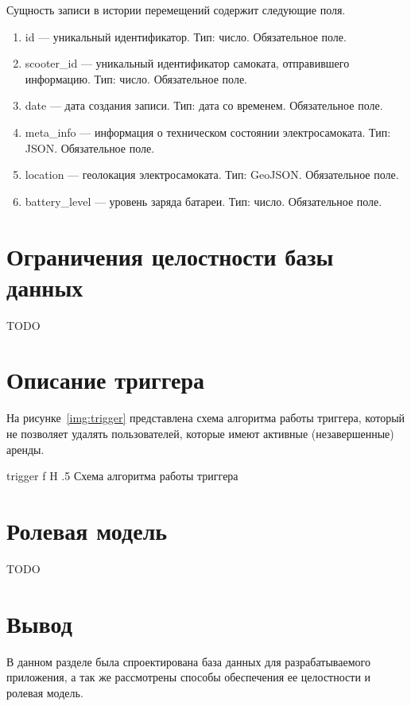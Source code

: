 Сущность записи в истории перемещений содержит следующие поля.

\begin{enumerate}
    \item id --- уникальный идентификатор. Тип: число. Обязательное поле.
    \item scooter\_id --- уникальный идентификатор самоката, отправившего информацию. Тип: число. Обязательное поле.
    \item date --- дата создания записи. Тип: дата со временем. Обязательное поле.
    \item meta\_info --- информация о техническом состоянии электросамоката. Тип: JSON. Обязательное поле.
    \item location --- геолокация электросамоката. Тип: GeoJSON. Обязательное поле.
    \item battery\_level --- уровень заряда батареи. Тип: число. Обязательное поле.
\end{enumerate}

\section{Ограничения целостности базы данных}

TODO

\section{Описание триггера}

На рисунке~\ref{img:trigger} представлена схема алгоритма работы триггера, который не позволяет удалять пользователей, которые имеют активные (незавершенные) аренды.

    {trigger}
    {f}
    {H}
    {.5\textwidth}
    {Схема алгоритма работы триггера}

\section{Ролевая модель}

TODO

\section*{Вывод}

В данном разделе была спроектирована база данных для разрабатываемого приложения, а так же рассмотрены способы обеспечения ее целостности и ролевая модель.